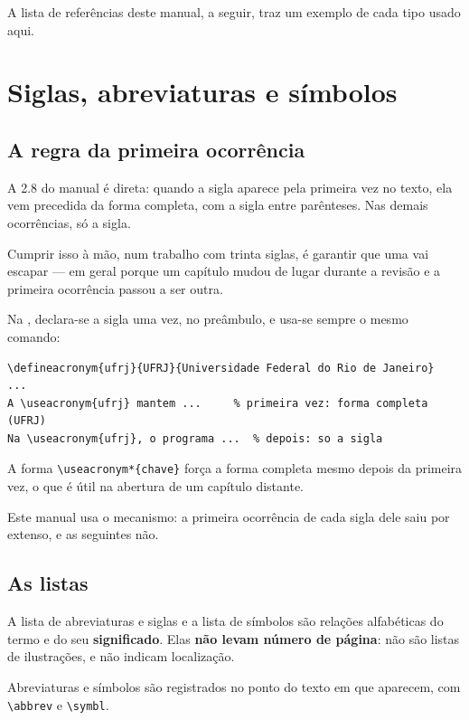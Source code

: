 \documentclass[dsc]{ufrj}
\begin{document}
  A lista de referências deste manual, a seguir, traz um exemplo de cada tipo
  usado aqui.

  \nocite{*}

  \chapter{Siglas, abreviaturas e símbolos}

  \section{A regra da primeira ocorrência}

  A 2.8 do manual é direta: quando a sigla aparece pela primeira vez no texto,
  ela vem precedida da forma completa, com a sigla entre parênteses. Nas demais
  ocorrências, só a sigla.

  Cumprir isso à mão, num trabalho com trinta siglas, é garantir que uma vai
  escapar --- em geral porque um capítulo mudou de lugar durante a revisão e a
  primeira ocorrência passou a ser outra.

  Na \CoppeTeX, declara-se a sigla uma vez, no preâmbulo, e usa-se sempre o mesmo
  comando:

\begin{verbatim}
\defineacronym{ufrj}{UFRJ}{Universidade Federal do Rio de Janeiro}
...
A \useacronym{ufrj} mantem ...     % primeira vez: forma completa (UFRJ)
Na \useacronym{ufrj}, o programa ...  % depois: so a sigla
\end{verbatim}

  A forma \verb|\useacronym*{chave}| força a forma completa mesmo depois da primeira
  vez, o que é útil na abertura de um capítulo distante.

  Este manual usa o mecanismo: a primeira ocorrência de cada sigla dele saiu por
  extenso, e as seguintes não.

  \section{As listas}

  A lista de abreviaturas e siglas e a lista de símbolos são relações
  alfabéticas do termo e do seu \textbf{significado}. Elas \textbf{não levam
  número de página}: não são listas de ilustrações, e não indicam localização.

  Abreviaturas e símbolos são registrados no ponto do texto em que aparecem, com
  \verb|\abbrev| e \verb|\symbl|.
\end{document}
